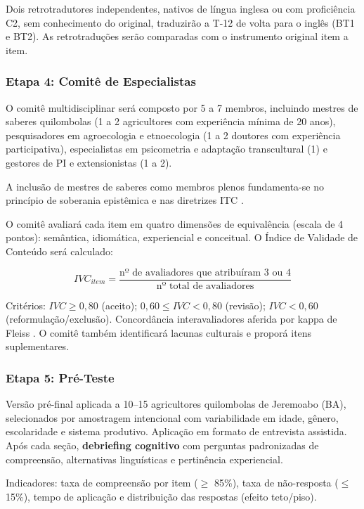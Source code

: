 Dois retrotradutores independentes, nativos de língua inglesa ou com proficiência C2, sem conhecimento do original, traduzirão a T-12 de volta para o inglês (BT1 e BT2). As retrotraduções serão comparadas com o instrumento original item a item.

\subsubsection{Etapa 4: Comitê de Especialistas}

O comitê multidisciplinar será composto por 5 a 7 membros, incluindo mestres de saberes quilombolas (1 a 2 agricultores com experiência mínima de 20 anos), pesquisadores em agroecologia e etnoecologia (1 a 2 doutores com experiência participativa), especialistas em psicometria e adaptação transcultural (1) e gestores de PI e extensionistas (1 a 2).

A inclusão de mestres de saberes como membros plenos fundamenta-se no princípio de soberania epistêmica \cite{Santos2007} e nas diretrizes ITC \cite{ITC2017}.

O comitê avaliará cada item em quatro dimensões de equivalência (escala de 4 pontos): semântica, idiomática, experiencial e conceitual. O Índice de Validade de Conteúdo será calculado:

\begin{equation}
IVC_{item} = \frac{\text{nº de avaliadores que atribuíram 3 ou 4}}{\text{nº total de avaliadores}}
\end{equation}

Critérios: $IVC \geq 0,80$ (aceito); $0,60 \leq IVC < 0,80$ (revisão); $IVC < 0,60$ (reformulação/exclusão). Concordância interavaliadores aferida por kappa de Fleiss \cite{Fleiss1971}. O comitê também identificará lacunas culturais e proporá itens suplementares.

\subsubsection{Etapa 5: Pré-Teste}

Versão pré-final aplicada a 10--15 agricultores quilombolas de Jeremoabo (BA), selecionados por amostragem intencional com variabilidade em idade, gênero, escolaridade e sistema produtivo. Aplicação em formato de entrevista assistida. Após cada seção, \textbf{debriefing cognitivo} \cite{Willis2005} com perguntas padronizadas de compreensão, alternativas linguísticas e pertinência experiencial.

Indicadores: taxa de compreensão por item ($\geq$ 85\%), taxa de não-resposta ($\leq$ 15\%), tempo de aplicação e distribuição das respostas (efeito teto/piso).

